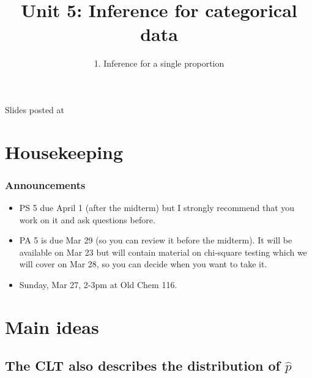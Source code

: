 \documentclass[slidestop,compress,mathserif,12pt,t,professionalfonts,xcolor=table]{beamer}
\title{Unit 5: Inference for categorical data}
\subtitle{1. Inference for a single proportion}
\author{\CourseName}
\date{}
\institute{\InstituteName}
\begin{document}



\begin{frame}[plain]

\titlepage

\vfill

{\scriptsize {} \hfill Slides posted at  \webURL{\CourseSite}}

\addtocounter{framenumber}{-1} 

\end{frame}


\section{Housekeeping}


\begin{frame}
\frametitle{Announcements}

\begin{itemize}

\item PS 5 due April 1 (after the midterm) but I strongly recommend that you work on it and ask questions before.

\item PA 5 is due Mar 29 (so you can review it before the midterm). It will be available on Mar 23 but will contain material on chi-square testing which we will cover on Mar 28, so you can decide when you want to take it.

\item Sunday, Mar 27, 2-3pm at Old Chem 116.

\end{itemize}

\end{frame}


\section{Main ideas}


\subsection{The CLT also describes the distribution of $\hat{p}$}
\label{mi2}
\end{document}
